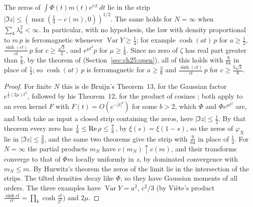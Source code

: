 \begin{proposition}\label{fm:prop:bruijn}
The zeros of $\int\Phi(t)m(t)e^{izt}\,dt$ lie in the strip $|\Im z|\le(\max(\frac14-c(m),0))^{1/2}$. The same holds for $N=\infty$ when $\sum_k\lambda_k^2<\infty$. In particular, with no hypothesis, the law with density proportional to $m\,p$ is ferromagnetic whenever $\operatorname{Var}Y\ge\frac14$; for example $\cosh(at)\,p$ for $a\ge\frac12$, $\frac{\sinh(ct)}{ct}\,p$ for $c\ge\frac{\sqrt3}2$, and $e^{\mu t^2}p$ for $\mu\ge\frac18$. Since no zero of $\zeta$ has real part greater than $\frac78$, by the theorem of \cite{OAI26a} (Section~\ref{sec:ch25:open}), all of this holds with $\frac9{64}$ in place of $\frac14$; so $\cosh(at)\,p$ is ferromagnetic for $a\ge\frac38$ and $\frac{\sinh(ct)}{ct}\,p$ for $c\ge\frac{3\sqrt3}8$.
\end{proposition}

\begin{proof}
For finite $N$ this is de Bruijn's Theorem~13, for the Gaussian factor $e^{\frac12(2\mu)t^2}$, followed by his Theorem~12, for the product of cosines \cite{deBruijn}; both apply to an even kernel $F$ with $F(t)=O(e^{-|t|^b})$ for some $b>2$, which $\Phi$ and $\Phi e^{\mu t^2}$ are, and both take as input a closed strip containing the zeros, here $|\Im z|\le\frac12$. By that theorem every zero has $\frac18\le\operatorname{Re}\rho\le\frac78$, by $\xi(s)=\xi(1-s)$, so the zeros of $\varphi_X$ lie in $|\Im z|\le\frac38$, and the same two theorems give the strip with $\frac9{64}$ in place of $\frac14$. For $N=\infty$ the partial products $m_N$ have $c(m_N)\uparrow c(m)$, and their transforms converge to that of $\Phi m$ locally uniformly in $z$, by dominated convergence with $m_N\le m$. By Hurwitz's theorem the zeros of the limit lie in the intersection of the strips. The tilted densities decay like $\Phi$, so they have Gaussian moments of all orders. The three examples have $\operatorname{Var}Y=a^2$, $c^2/3$ (by Vi\`ete's product $\frac{\sinh ct}{ct}=\prod_k\cosh\frac{ct}{2^k}$) and $2\mu$.
\end{proof}

